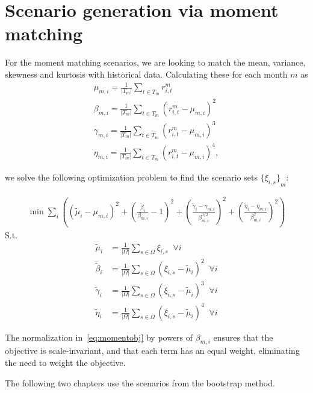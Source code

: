 \section{Scenario generation via moment matching}\label{sec:ScenGenMM}

For the moment matching scenarios, we are looking to match the mean, variance, skewness and kurtosis with historical data.
Calculating these for each month $m$ as
\begin{gather}
\mu_{m,i} = \frac{1}{|T_m|} \sum_{t \in T_m} r^m_{i,t} \\
\beta_{m,i} = \frac{1}{|T_m|} \sum_{t \in T_m} {\left( r^m_{i,t} - \mu_{m,i} \right)}^2 \\
\gamma_{m,i} = \frac{1}{|T_m|} \sum_{t \in T_m} {\left( r^m_{i,t} - \mu_{m,i} \right)}^3 \\
\eta_{m,i} = \frac{1}{|T_m|} \sum_{t \in T_m} {\left( r^m_{i,t} - \mu_{m,i} \right)}^4 ,
\end{gather}

we solve the following optimization problem to find the scenario sets ${\{\xi_{i,s}\}}_{m}$:

\begin{align}
\min \sum_i \left(
	{(\tilde{\mu}_i - \mu_{m,i})}^2 +
	{\left( \frac{\tilde{\beta}_i}{\beta_{m,i}} - 1 \right)}^2 +
	{\left( \frac{\tilde{\gamma}_i - \gamma_{m,i}}{\beta_{m,i}^{3/2}} \right)}^2 +
	{\left( \frac{\tilde{\eta}_i - \eta_{m,i}}{\beta_{m,i}^{2}} \right)}^2
\right)
\label{eq:momentobj}
\end{align}
S.t.
\begin{align}
\tilde{\mu}_i &= \frac{1}{|\Omega|} \sum_{s \in \Omega} \xi_{i,s} \; \; \forall i \\
\tilde{\beta}_i &= \frac{1}{|\Omega|} \sum_{s \in \Omega} {\left( \xi_{i,s} - \tilde{\mu}_i \right)}^2 \; \; \forall i \\
\tilde{\gamma}_i &= \frac{1}{|\Omega|} \sum_{s \in \Omega} {\left( \xi_{i,s} - \tilde{\mu}_i \right)}^3 \; \; \forall i \\
\tilde{\eta}_i &= \frac{1}{|\Omega|} \sum_{s \in \Omega} {\left( \xi_{i,s} - \tilde{\mu}_i \right)}^4 \; \; \forall i
\end{align}

The normalization in~\eqref{eq:momentobj} by powers of $\beta_{m,i}$ ensures that the objective is scale-invariant, and that each term has an equal weight, eliminating the need to weight the objective.

The following two chapters use the scenarios from the bootstrap method.
